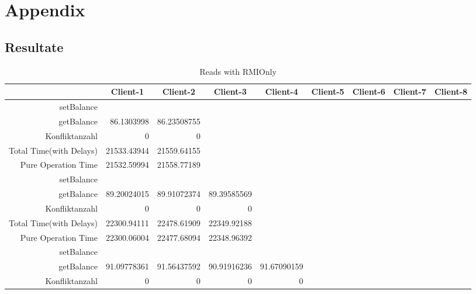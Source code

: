 \section{Appendix}
\subsection{Resultate}
\begin{landscape}
\begin{table}[htbp]
  \scriptsize
  \centering
  \caption{Reads with RMIOnly}
    \begin{tabular}{rrrrrrrrr}
    \toprule
          & \multicolumn{1}{c}{Client-1} & \multicolumn{1}{c}{Client-2} & \multicolumn{1}{c}{Client-3} & \multicolumn{1}{c}{Client-4} & \multicolumn{1}{c}{Client-5} & \multicolumn{1}{c}{Client-6} & \multicolumn{1}{c}{Client-7} & \multicolumn{1}{c}{Client-8} \\
    \midrule
    setBalance &       &       &       &       &       &       &       &  \\
    getBalance & 86.1303998 & 86.23508755 &       &       &       &       &       &  \\
    Konfliktanzahl & 0     & 0     &       &       &       &       &       &  \\
    Total Time(with Delays) & 21533.43944 & 21559.64155 &       &       &       &       &       &  \\
    Pure Operation Time & 21532.59994 & 21558.77189 &       &       &       &       &       &  \\
     \cline{1-9}
    setBalance &       &       &       &       &       &       &       &  \\
    getBalance & 89.20024015 & 89.91072374 & 89.39585569 &       &       &       &       &  \\
    Konfliktanzahl & 0     & 0     & 0     &       &       &       &       &  \\
    Total Time(with Delays) & 22300.94111 & 22478.61909 & 22349.92188 &       &       &       &       &  \\
    Pure Operation Time & 22300.06004 & 22477.68094 & 22348.96392 &       &       &       &       &  \\
    \cline{1-9}
    setBalance &       &       &       &       &       &       &       &  \\
    getBalance & 91.09778361 & 91.56437592 & 90.91916236 & 91.67090159 &       &       &       &  \\
    Konfliktanzahl & 0     & 0     & 0     & 0     &       &       &       &  \\

\end{tabular}
\end{table}
\end{landscape}

